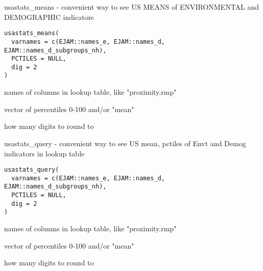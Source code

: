 \documentclass[a4paper]{book}
\begin{document}
%
\begin{Description}\relax
usastats\_means - convenient way to see US MEANS of ENVIRONMENTAL and DEMOGRAPHIC indicators
\end{Description}
%
\begin{Usage}
\begin{verbatim}
usastats_means(
  varnames = c(EJAM::names_e, EJAM::names_d, EJAM::names_d_subgroups_nh),
  PCTILES = NULL,
  dig = 2
)
\end{verbatim}
\end{Usage}
%
\begin{Arguments}
\begin{ldescription}
\item[\code{varnames}] names of columns in lookup table, like "proximity.rmp"

\item[\code{PCTILES}] vector of percentiles 0-100 and/or "mean"

\item[\code{dig}] how many digits to round to
\end{ldescription}
\end{Arguments}
%
\begin{Description}\relax
usastats\_query - convenient way to see US mean, pctiles of Envt and Demog indicators in lookup table
\end{Description}
%
\begin{Usage}
\begin{verbatim}
usastats_query(
  varnames = c(EJAM::names_e, EJAM::names_d, EJAM::names_d_subgroups_nh),
  PCTILES = NULL,
  dig = 2
)
\end{verbatim}
\end{Usage}
%
\begin{Arguments}
\begin{ldescription}
\item[\code{varnames}] names of columns in lookup table, like "proximity.rmp"

\item[\code{PCTILES}] vector of percentiles 0-100 and/or "mean"

\item[\code{dig}] how many digits to round to
\end{ldescription}
\end{Arguments}
\end{document}
